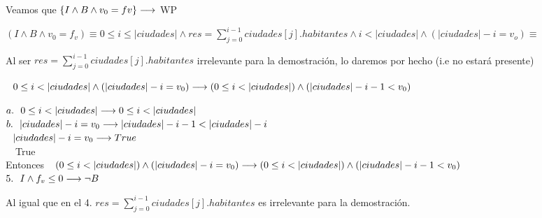 \documentclass[10pt,a4paper]{article}
\begin{document}
\vspace{0.2cm}

Veamos que $\left\{I \wedge B \wedge v_0=f v\right\} \longrightarrow $ WP \\

\vspace{0.2cm}

$(I \land B \land v_0 =f_v) \equiv 0 \leq i \leq |ciudades| \land res = \sum\limits_{j=0}^{i-1} ciudades[j].habitantes \land i < |ciudades| \land (|ciudades| - i = v_o) \equiv $ \\

\vspace{0.2cm}

Al ser $res = \sum\limits_{j=0}^{i-1} ciudades[j].habitantes$ irrelevante para la demostración, lo daremos por hecho (i.e no estará presente) \\ 

\vspace{0.2cm}

\equiv $\ \ 0 \leq i < |ciudades| \land (|ciudades| - i = v_0) \longrightarrow (0 \leq i < |ciudades|) \land (|ciudades| - i - 1 < v_0)$ \\


\vspace{0.2cm}

$a.\ \ 0 \leq i < |ciudades| \longrightarrow 0 \leq i < |ciudades|$\ \ \checkmark \\

$b. \ \ |ciudades| - i = v_0 \longrightarrow |ciudades| - i - 1 < |ciudades| - i$ \equiv \\

\equiv $\ \ \vert ciudades| - i = v_0 \longrightarrow True$ \equiv \\

\equiv \ \ True \ \ \checkmark \\

Entonces $\ \ (0 \leq i < |ciudades|) \land (|ciudades| - i = v_0) \longrightarrow (0 \leq i < |ciudades|) \land (|ciudades| - i - 1 < v_0)$ \ \ \checkmark \\



\vspace{0.3cm}
$5.\ \ I \wedge f_v \leq 0 \longrightarrow \neg B$ \\
\vspace{0.2cm}

Al igual que en el 4. $res = \sum\limits_{j=0}^{i-1} ciudades[j].habitantes$ es irrelevante para la demostración. \\ 
\end{document}
